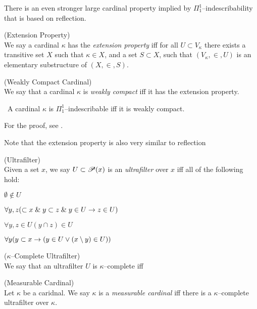 There is an even stronger large cardinal property implied by $\Pi_1^1$–indescribability that is based on reflection.

\begin{definition}{(Extension Property)}\label{def:extension_property}\\
We say a cardinal $\kappa$ has the \emph{extension property} iff for all $U \subset V_\kappa$ there exists a transitive set $X$ such that $\kappa \in X$, and a set $S \subset X$, such that $(V_\kappa, \in, U)$ is an elementary substructure of $(X, \in, S)$.
\end{definition}

\begin{definition}{(Weakly Compact Cardinal)}\label{def:weakly_compact_cardinal}\\
We say that a cardinal $\kappa$ is \emph{weakly compact} iff it has the extension property.
\end{definition}

\begin{theorem}\
A cardinal $\kappa$ is $\Pi_1^1$–indescribable iff it is weakly compact.
\end{theorem}
For the proof, see \cite{KanamoriBook}. %

Note that the extension property is also very similar to reflection

\begin{definition}{(Ultrafilter)}\\
Given a set $x$, we say $U \subset \mathscr{P} (x)$ is an \emph{ultrafilter} over $x$ iff all of the following hold:
\bce[(i)]
\item $\emptyset \not\in U$
\item $\forall y, z (\subset x \mathrel{\&} y \subset z \mathrel{\&} y \in U \rightarrow z \in U)$
\item $\forall y, z \in U (y \cap z) \in U$
\item $\forall y (y \subset x \rightarrow (y \in U \lor (x \setminus y) \in U))$
\ece
\end{definition}

\begin{definition}{($\kappa$–Complete Ultrafilter)}\\
We say that an ultrafilter $U$ is $\kappa$–complete iff
\end{definition}

\begin{definition}{(Measurable Cardinal)}\\
Let $\kappa$ be a caridnal. We say $\kappa$ is a \emph{measurable cardinal} iff there is a $\kappa$–complete ultrafilter over $\kappa$.
\end{definition}

